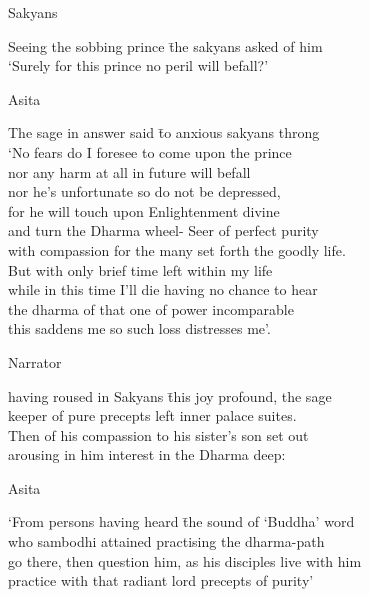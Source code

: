 \begin{MyDescription}[]{Sakyans}
\end{MyDescription}  
\begin{tabbing}
Seeing the sobbing prince \hspace{0.5cm} \=  the sakyans asked of him\\
`Surely for this prince \> no peril will befall?'
\end{tabbing}

\begin{MyDescription}[]{Asita}
\end{MyDescription}  
\begin{tabbing}
The sage in answer said \hspace{0.5cm}\= to anxious sakyans throng\\
`No fears do I foresee \> to come upon the prince\\
nor any harm at all \> in future will befall\\
nor he's unfortunate \> so do not be depressed,\\
for he will touch upon \> Enlightenment divine\\
and turn the Dharma wheel- \> Seer of perfect purity\\
with compassion for the many \> set forth the goodly life.\\
But with only brief \> time left within my life\\
while in this time I'll die \> having no chance to hear\\
the dharma of that one \> of power incomparable\\
this saddens me so \> such loss distresses me'.\\
\end{tabbing}

\begin{MyDescription}[]{Narrator}
\end{MyDescription}  
\begin{tabbing}
having roused in Sakyans \hspace{0.5cm} \= this joy profound, the sage\\
keeper of pure precepts \> left inner palace suites.\\
Then of his compassion \> to his sister's son set out\\
arousing in him interest \> in the Dharma deep:\\
\end{tabbing}

\begin{MyDescription}[]{Asita}
\end{MyDescription}  
\begin{tabbing}
`From persons having heard \hspace{0.5cm}\= the sound of `Buddha' word\\
who sambodhi attained \> practising the dharma-path\\
go there, then question him, \> as his disciples live with him\\
practice with that radiant lord \> precepts of purity'
\end{tabbing}

